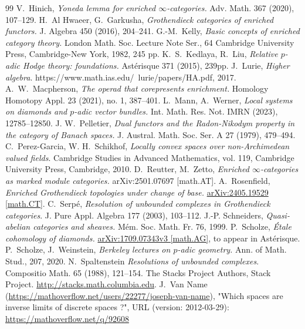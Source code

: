 \documentclass[10pt]{amsart}
\theoremstyle{definition}
\theoremstyle{remark}
\numberwithin{equation}{section}
\numberwithin{equation}{section}
\begin{document}
\begin{thebibliography}{99}
 V.~Hinich, {\em Yoneda lemma for enriched $\infty$-categories.} Adv. Math. 367 (2020), 107--129.
 H.~Al Hwaeer, G.~Garkusha, {\em Grothendieck categories of enriched functors.} J. Algebra 450 (2016), 204--241.
 G.-M.~Kelly, {\em Basic concepts of enriched category theory.}
London Math. Soc. Lecture Note Ser., 64
Cambridge University Press, Cambridge-New York, 1982, 245 pp.
K.~S.~Kedlaya, R.~Liu,  {\em Relative $p$-adic Hodge theory: foundations.} 
Ast\'erisque 371 (2015), 239pp.
 J.~Lurie, {\em Higher algebra}. https://www.math.ias.edu/~lurie/papers/HA.pdf, 2017.
A.~W.~Macpherson, {\em The operad that corepresents enrichment.}  Homology Homotopy Appl. 23 (2021), no. 1, 387--401.
 L.~Mann, A.~Werner, {\em Local systems on diamonds and $p$-adic vector bundles.} Int. Math. Res. Not. IMRN (2023), 12785--12850.
 J. W.~Pelletier, {\em Dual functors and the Radon-Nikodym property in the category of Banach spaces.}
J. Austral. Math. Soc. Ser. A 27 (1979), 479--494.
 C.~Perez-Garcia,  W. H.~Schikhof, {\em Locally convex spaces over non-Archimedean valued fields}. Cambridge
Studies in Advanced Mathematics, vol. 119, Cambridge University Press, Cambridge, 2010.
 D.~Reutter, M.~Zetto, {\em Enriched $\infty$-categories as marked module categories.} arXiv:2501.07697 [math.AT].
 A.~Rosenfield, {\em Enriched Grothendieck topologies under change of base.}  	
\url{arXiv:2405.19529 [math.CT]}.
 C.~Serp\'e, {\em Resolution of unbounded complexes in Grothendieck categories}.  J. Pure Appl. Algebra 177 (2003), 103--112.
 J.-P. Schneiders, {\em Quasi-abelian categories and sheaves.} M\'em. Soc. Math. Fr. 76, 1999.
 P.~Scholze, {\em  \'Etale cohomology of diamonds.} \url{arXiv:1709.07343v3 [math.AG]},
to appear in Ast\'erisque.
 P.~Scholze, J.~Weinstein, {\em Berkeley lectures on $p$-adic geometry.} Ann. of Math. Stud., 207,  2020.
 N.~Spaltenstein {\em Resolutions of unbounded complexes}. Compositio Math. 65 (1988), 121--154.
 The Stacks Project Authors, Stack Project. \url{http://stacks.math.columbia.edu}.
 J.~Van Name (\url{https://mathoverflow.net/users/22277/joseph-van-name}), "Which spaces are inverse limits of discrete spaces ?", URL (version: 2012-03-29): \url{https://mathoverflow.net/q/92608}
\end{thebibliography}
\end{document}
